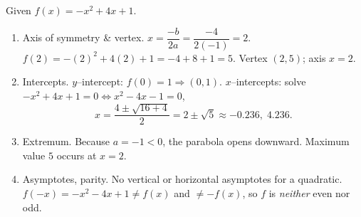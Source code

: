 \documentclass[11pt]{article}
\def\textbf#1{#1}%
\begin{document}
\begin{solution}
\textbf{Given } $f(x)=-x^{2}+4x+1$.

\begin{enumerate}
  \item \textbf{Axis of symmetry \& vertex.} \quad
  $x=\dfrac{-b}{2a}=\dfrac{-4}{2(-1)}=2$. \;
  $f(2)=-(2)^2+4(2)+1=-4+8+1=5$. \;
  Vertex $(2,5)$; axis $x=2$.
  \item \textbf{Intercepts.}\;
  $y$–intercept: $f(0)=1\Rightarrow (0,1)$.\;
  $x$–intercepts: solve $-x^2+4x+1=0\iff x^2-4x-1=0$,
  \[
    x=\frac{4\pm\sqrt{16+4}}{2}=2\pm\sqrt{5}
    \approx -0.236,\; 4.236.
  \]
  \item \textbf{Extremum.} Because $a=-1<0$, the parabola opens downward.
  Maximum value $5$ occurs at $x=2$.
  \item \textbf{Asymptotes, parity.} No vertical or horizontal asymptotes for a quadratic.
  $f(-x)=-x^2-4x+1\neq f(x)$ and $\neq -f(x)$, so $f$ is \emph{neither} even nor odd.
\end{enumerate}

\begin{center}
\end{center}
\end{solution}
\end{document}
